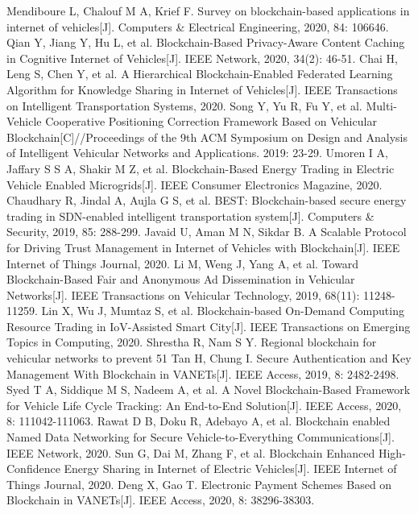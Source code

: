 \begin{thebibliography}{99}
 Mendiboure L, Chalouf M A, Krief F. Survey on blockchain-based applications in internet of vehicles[J]. Computers & Electrical Engineering, 2020, 84: 106646.
 Qian Y, Jiang Y, Hu L, et al. Blockchain-Based Privacy-Aware Content Caching in Cognitive Internet of Vehicles[J]. IEEE Network, 2020, 34(2): 46-51.
 Chai H, Leng S, Chen Y, et al. A Hierarchical Blockchain-Enabled Federated Learning Algorithm for Knowledge Sharing in Internet of Vehicles[J]. IEEE Transactions on Intelligent Transportation Systems, 2020.
 Song Y, Yu R, Fu Y, et al. Multi-Vehicle Cooperative Positioning Correction Framework Based on Vehicular Blockchain[C]//Proceedings of the 9th ACM Symposium on Design and Analysis of Intelligent Vehicular Networks and Applications. 2019: 23-29.
 Umoren I A, Jaffary S S A, Shakir M Z, et al. Blockchain-Based Energy Trading in Electric Vehicle Enabled Microgrids[J]. IEEE Consumer Electronics Magazine, 2020.
 Chaudhary R, Jindal A, Aujla G S, et al. BEST: Blockchain-based secure energy trading in SDN-enabled intelligent transportation system[J]. Computers & Security, 2019, 85: 288-299.
 Javaid U, Aman M N, Sikdar B. A Scalable Protocol for Driving Trust Management in Internet of Vehicles with Blockchain[J]. IEEE Internet of Things Journal, 2020.
 Li M, Weng J, Yang A, et al. Toward Blockchain-Based Fair and Anonymous Ad Dissemination in Vehicular Networks[J]. IEEE Transactions on Vehicular Technology, 2019, 68(11): 11248-11259.
 Lin X, Wu J, Mumtaz S, et al. Blockchain-based On-Demand Computing Resource Trading in IoV-Assisted Smart City[J]. IEEE Transactions on Emerging Topics in Computing, 2020.
 Shrestha R, Nam S Y. Regional blockchain for vehicular networks to prevent 51%
 Tan H, Chung I. Secure Authentication and Key Management With Blockchain in VANETs[J]. IEEE Access, 2019, 8: 2482-2498.
 Syed T A, Siddique M S, Nadeem A, et al. A Novel Blockchain-Based Framework for Vehicle Life Cycle Tracking: An End-to-End Solution[J]. IEEE Access, 2020, 8: 111042-111063.
 Rawat D B, Doku R, Adebayo A, et al. Blockchain enabled Named Data Networking for Secure Vehicle-to-Everything Communications[J]. IEEE Network, 2020.
 Sun G, Dai M, Zhang F, et al. Blockchain Enhanced High-Confidence Energy Sharing in Internet of Electric Vehicles[J]. IEEE Internet of Things Journal, 2020.
 Deng X, Gao T. Electronic Payment Schemes Based on Blockchain in VANETs[J]. IEEE Access, 2020, 8: 38296-38303.

\end{thebibliography}
